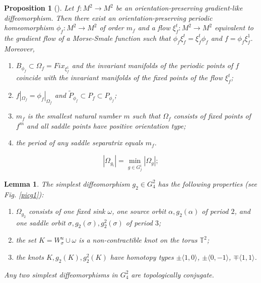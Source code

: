 \documentclass[10pt,a4paper]{amsart}
\newtheorem{propos}{Proposition}
\newtheorem{lemma}{Lemma}
\begin{document}
	\begin{propos}[\cite{treh}]\label{mn} Let $f:M^2 \rightarrow M^2$ be an orientation-preserving gradient-like diffeomorphism. Then there exist an orientation-preserving periodic homeomorphism $\phi_f:M^2 \rightarrow M^2$ of order $m_{f}$ and a flow $\xi^t_f:M^2 \rightarrow M^2$ equivalent to the gradient flow of a Morse-Smale function such that $\phi_f\xi^t_f=\xi^t_f\phi_f$ and $f=\phi_f\xi^1_f$. Moreover,
		\begin{enumerate}
			\item[1)] $B_{\phi_f}\subset\Omega_f=Fix_{\xi^1_f}$ and the invariant manifolds of the periodic points of $f$ coincide with the invariant manifolds of the fixed points of the flow $\xi^t_f$; 
			\item[2)] $f|_{\Omega_f}=\phi_f|_{\Omega_f}$ and $\tilde P_{\phi_f} \subset P_f \subset P_{\phi_f}$;
			\item[3)] $m_f$ is the smallest natural number $m$ such that $\Omega_f$ consists of fixed points of $f^m$ and all saddle points have positive orientation type; 
			\item[4)] the period of any saddle separatrix equals $m_f$.
		\end{enumerate}
	\end{propos}

	\begin{equation}\label{min}
		|\Omega_{g_{i}}|=\min_{g\in G_j^i}|\Omega_g|;
	\end{equation}

	\begin{lemma}\label{g10} The simplest diffeomorphism $g_{2}\in G_4^2$ has the following properties (see Fig. \ref{picg1}):
		\begin{enumerate}
			\item[1)] $\Omega_{g_{2}}$ consists of one fixed sink $\omega$, one source orbit $\alpha,g_{2}(\alpha)$ of period $2$, and one saddle orbit $\sigma,g_{2}(\sigma),g_{2}^2(\sigma)$ of period $3$;
			\item[2)] the set $K=W^u_\sigma\cup\omega$ is a non-contractible knot on the torus $\mathbb T^2$;
			\item[3)] the knots $K,g_{2}(K), g_{2}^2(K)$ have homotopy types $\pm\langle 1,0\rangle$, $\pm\langle 0,-1\rangle$, $\mp\langle 1,1\rangle$. 
		\end{enumerate}
		Any two simplest diffeomorphisms in $G_4^2$ are topologically conjugate.	
	\end{lemma}
\end{document}
